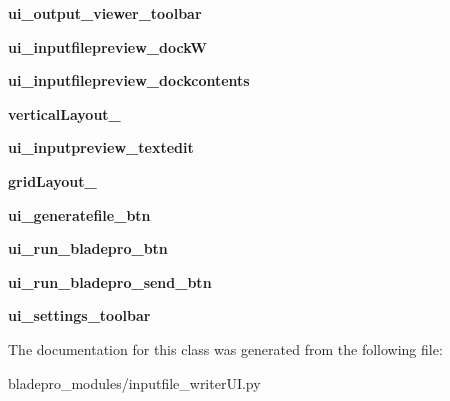 \begin{DoxyCompactItemize}
{\bfseries ui\+\_\+output\+\_\+viewer\+\_\+toolbar}
\item 
\hypertarget{a00075_a0320b1d504d7c939f637497d3ddb29cd}{}\label{a00075_a0320b1d504d7c939f637497d3ddb29cd} 
{\bfseries ui\+\_\+inputfilepreview\+\_\+dockW}
\item 
\hypertarget{a00075_a0a9b9095e43dff8b0591f5c99ed096b8}{}\label{a00075_a0a9b9095e43dff8b0591f5c99ed096b8} 
{\bfseries ui\+\_\+inputfilepreview\+\_\+dockcontents}
\item 
\hypertarget{a00075_af6dda5301b2c18cc6cb517d406371cd8}{}\label{a00075_af6dda5301b2c18cc6cb517d406371cd8} 
{\bfseries vertical\+Layout\+\_}
\item 
\hypertarget{a00075_a0a84b37e3d14b098f01ea8245886422b}{}\label{a00075_a0a84b37e3d14b098f01ea8245886422b} 
{\bfseries ui\+\_\+inputpreview\+\_\+textedit}
\item 
\hypertarget{a00075_a1165976bce8597d5c2b05749090db4bb}{}\label{a00075_a1165976bce8597d5c2b05749090db4bb} 
{\bfseries grid\+Layout\+\_}
\item 
\hypertarget{a00075_aebd557fcfd5421d6699c90c70a00964a}{}\label{a00075_aebd557fcfd5421d6699c90c70a00964a} 
{\bfseries ui\+\_\+generatefile\+\_\+btn}
\item 
\hypertarget{a00075_a0cf12a13035007f59d8f7d6412303347}{}\label{a00075_a0cf12a13035007f59d8f7d6412303347} 
{\bfseries ui\+\_\+run\+\_\+bladepro\+\_\+btn}
\item 
\hypertarget{a00075_a0138512db7f881556de8ed89ee615c76}{}\label{a00075_a0138512db7f881556de8ed89ee615c76} 
{\bfseries ui\+\_\+run\+\_\+bladepro\+\_\+send\+\_\+btn}
\item 
\hypertarget{a00075_a4610a54fb1790404af1664e4aa5d5883}{}\label{a00075_a4610a54fb1790404af1664e4aa5d5883} 
{\bfseries ui\+\_\+settings\+\_\+toolbar}
\end{DoxyCompactItemize}


The documentation for this class was generated from the following file\+:\begin{DoxyCompactItemize}
\item 
bladepro\+\_\+modules/inputfile\+\_\+writer\+U\+I.\+py\end{DoxyCompactItemize}

